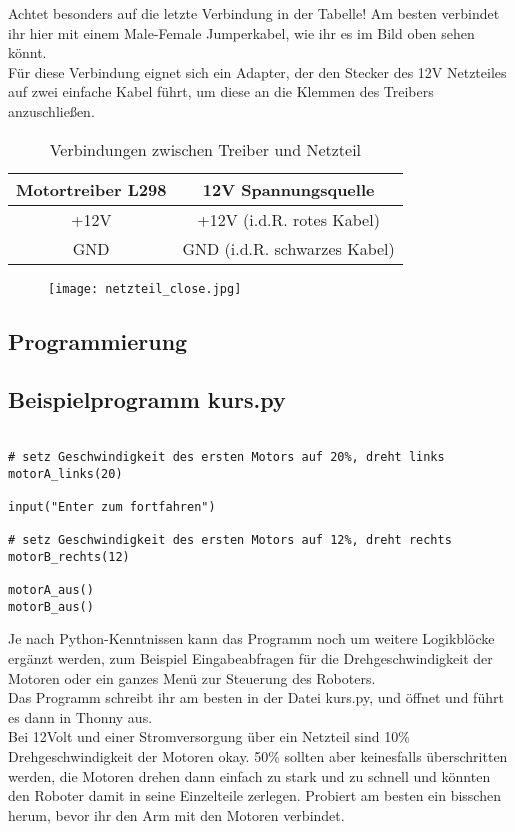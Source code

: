 Achtet besonders auf die letzte Verbindung in der Tabelle! Am besten verbindet ihr hier mit einem Male-Female Jumperkabel, wie ihr es im Bild oben sehen könnt.\\

Für diese Verbindung eignet sich ein Adapter, der den Stecker des 12V Netzteiles auf zwei einfache Kabel führt, um diese an die Klemmen des Treibers anzuschließen.

\begin{table}[h]
  \begin{center}
\begin{tabular}{@{}cc@{}}
\toprule
Motortreiber L298 & 12V Spannungsquelle          \\ \midrule
+12V              & +12V (i.d.R. rotes Kabel)    \\
GND               & GND (i.d.R. schwarzes Kabel) \\ \bottomrule
\end{tabular}
\end{center}
\caption{Verbindungen zwischen Treiber und Netzteil}
\end{table}

\begin{figure}[h]
\centering
\texttt{[image: netzteil\_close.jpg]}
\end{figure}


\subsection{Programmierung}
\subsection{Beispielprogramm kurs.py}


\begin{lstlisting}

# setz Geschwindigkeit des ersten Motors auf 20%, dreht links
motorA_links(20)

input("Enter zum fortfahren")

# setz Geschwindigkeit des ersten Motors auf 12%, dreht rechts
motorB_rechts(12)

motorA_aus()
motorB_aus()

\end{lstlisting}

Je nach Python-Kenntnissen kann das Programm noch um weitere Logikblöcke ergänzt werden, zum Beispiel Eingabeabfragen für die Drehgeschwindigkeit der Motoren oder ein ganzes Menü zur Steuerung des Roboters.\\
Das Programm schreibt ihr am besten in der Datei kurs.py, und öffnet und führt es dann in Thonny aus.\\
\hinweis Bei 12Volt und einer Stromversorgung über ein Netzteil sind 10\% Drehgeschwindigkeit der Motoren okay. 50\% sollten aber keinesfalls überschritten werden, die Motoren drehen dann einfach zu stark und zu schnell und könnten den Roboter damit in seine Einzelteile zerlegen. Probiert am besten ein bisschen herum, bevor ihr den Arm mit den Motoren verbindet.\\
